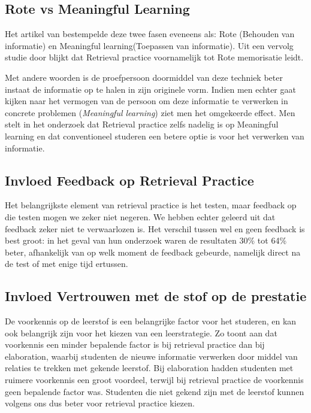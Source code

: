 \documentclass{hogent-article}
\begin{document}
\subsection{Rote vs Meaningful Learning}
\label{RoteVSMeaningful}
Het artikel van \textcite{Mayer_2002} bestempelde deze twee fasen eveneens als: Rote (Behouden van informatie) en Meaningful learning(Toepassen van informatie). Uit een vervolg studie door \textcite{van_Gog_2012} blijkt dat Retrieval practice voornamelijk tot Rote memorisatie leidt.\\

\par
\noindent
Met andere woorden is de proefpersoon doormiddel van deze techniek beter instaat de informatie op te halen in zijn originele vorm. Indien men echter gaat kijken naar het vermogen van de persoon om deze informatie te verwerken in concrete problemen (\textit{Meaningful learning}) ziet men het omgekeerde effect. Men stelt in het onderzoek dat Retrieval practice zelfs nadelig is op Meaningful learning en dat conventioneel studeren een betere optie is voor het verwerken van informatie.\\
\par
\noindent

\subsection{Invloed Feedback op Retrieval Practice}

Het belangrijkste element van retrieval practice is het testen, maar feedback op die testen mogen we zeker niet negeren. We hebben echter geleerd uit \cite{HenryRoediger2011} dat feedback zeker niet te verwaarlozen is. Het verschil tussen wel en geen feedback is best groot: in het geval van hun onderzoek waren de resultaten 30\% tot 64\% beter, afhankelijk van op welk moment de feedback gebeurde, namelijk direct na de test of met enige tijd ertussen. 

\subsection{Invloed Vertrouwen met de stof op de prestatie}

De voorkennis op de leerstof is een belangrijke factor voor het studeren, en kan ook 
belangrijk zijn voor het kiezen van een leerstrategie. Zo toont \cite{Xiaofeng2016} aan dat voorkennis een minder bepalende factor is bij retrieval practice dan bij elaboration, waarbij studenten de nieuwe informatie verwerken door middel van relaties te trekken met gekende leerstof.
Bij elaboration hadden studenten met ruimere voorkennis een groot voordeel, terwijl bij retrieval
practice de voorkennis geen bepalende factor was.
Studenten die niet gekend zijn met de leerstof kunnen volgens ons dus beter voor retrieval 
practice kiezen.
\end{document}
